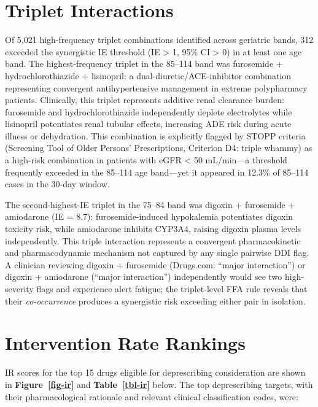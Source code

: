\documentclass[
  12pt,
]{book}
\begin{document}
\section{Triplet Interactions}\label{triplet-interactions}

Of 5,021 high-frequency triplet combinations identified across geriatric
bands, 312 exceeded the synergistic IE threshold (IE \textgreater{} 1,
95\% CI \textgreater{} 0) in at least one age band. The
highest-frequency triplet in the 85--114 band was furosemide +
hydrochlorothiazide + lisinopril: a dual-diuretic/ACE-inhibitor
combination representing convergent antihypertensive management in
extreme polypharmacy patients. Clinically, this triplet represents
additive renal clearance burden: furosemide and hydrochlorothiazide
independently deplete electrolytes while lisinopril potentiates renal
tubular effects, increasing ADE risk during acute illness or
dehydration. This combination is explicitly flagged by STOPP criteria
(Screening Tool of Older Persons' Prescriptions, Criterion D4: triple
whammy) as a high-risk combination in patients with eGFR \textless{} 50
mL/min---a threshold frequently exceeded in the 85--114 age band---yet
it appeared in 12.3\% of 85--114 cases in the 30-day window.

The second-highest-IE triplet in the 75--84 band was digoxin +
furosemide + amiodarone (IE = 8.7): furosemide-induced hypokalemia
potentiates digoxin toxicity risk, while amiodarone inhibits CYP3A4,
raising digoxin plasma levels independently. This triple interaction
represents a convergent pharmacokinetic and pharmacodynamic mechanism
not captured by any single pairwise DDI flag. A clinician reviewing
digoxin + furosemide (Drugs.com: ``major interaction'') or digoxin +
amiodarone (``major interaction'') independently would see two
high-severity flags and experience alert fatigue; the triplet-level FFA
rule reveals that their \emph{co-occurrence} produces a synergistic risk
exceeding either pair in isolation.

\section{Intervention Rate Rankings}\label{intervention-rate-rankings}

IR scores for the top 15 drugs eligible for deprescribing consideration
are shown in \textbf{Figure~\ref{fig-ir}} and
\textbf{Table~\ref{tbl-ir}} below. The top deprescribing targets, with
their pharmacological rationale and relevant clinical classification
codes, were:
\end{document}
